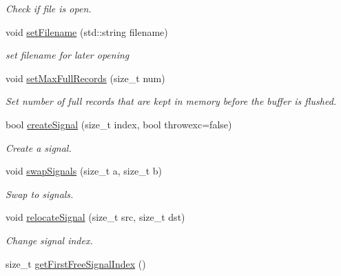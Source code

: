 \begin{DoxyCompactItemize}
\begin{DoxyCompactList}\small\item\em Check if file is open. \item\end{DoxyCompactList}\item 
void \hyperlink{classgdf_1_1_writer_ad8cab49e3b866304802924707fd9d367}{setFilename} (std::string filename)
\begin{DoxyCompactList}\small\item\em set filename for later opening \item\end{DoxyCompactList}\item 
void \hyperlink{classgdf_1_1_writer_a15b2d4702b41521a1dba4fe8b7f2986a}{setMaxFullRecords} (size\_\-t num)
\begin{DoxyCompactList}\small\item\em Set number of full records that are kept in memory before the buffer is flushed. \item\end{DoxyCompactList}\item 
bool \hyperlink{classgdf_1_1_writer_ab0dc03f3e4f125695c40c09ce66d9d16}{createSignal} (size\_\-t index, bool throwexc=false)
\begin{DoxyCompactList}\small\item\em Create a signal. \item\end{DoxyCompactList}\item 
void \hyperlink{classgdf_1_1_writer_a25563ed9d61e7b6935dc09bc469c9eb7}{swapSignals} (size\_\-t a, size\_\-t b)
\begin{DoxyCompactList}\small\item\em Swap to signals. \item\end{DoxyCompactList}\item 
void \hyperlink{classgdf_1_1_writer_ab69e32b0fb120731544cbff10d6e3a3f}{relocateSignal} (size\_\-t src, size\_\-t dst)
\begin{DoxyCompactList}\small\item\em Change signal index. \item\end{DoxyCompactList}\item 
\hypertarget{classgdf_1_1_writer_ae7328f77c14354b57608c9c8097e4a51}{
size\_\-t \hyperlink{classgdf_1_1_writer_ae7328f77c14354b57608c9c8097e4a51}{getFirstFreeSignalIndex} ()}
\label{classgdf_1_1_writer_ae7328f77c14354b57608c9c8097e4a51}


\end{DoxyCompactItemize}
